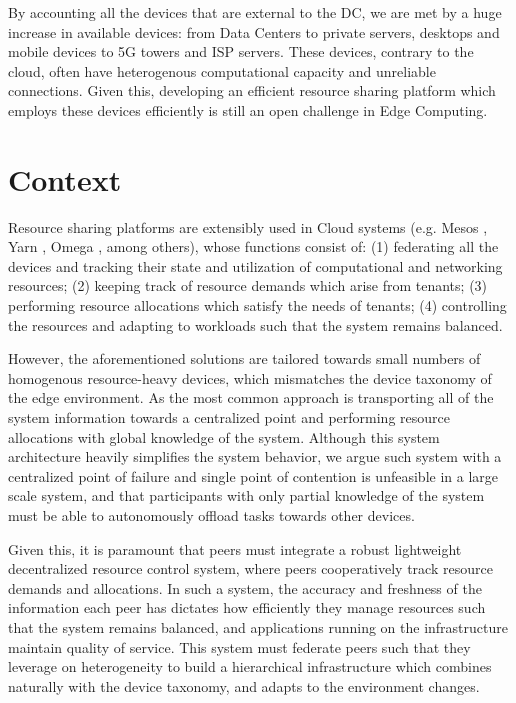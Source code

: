By accounting all the devices that are external to the DC, we are met by a huge increase in available devices: from Data Centers to private servers, desktops and mobile devices to 5G towers and ISP servers. These devices, contrary to the cloud, often have heterogenous computational capacity and unreliable connections. Given this, developing an efficient resource sharing platform which employs these devices efficiently is still an open challenge in Edge Computing. 

\section{Context}

Resource sharing platforms are extensibly used in Cloud systems (e.g. Mesos \cite{hindman2011mesos}, Yarn \cite{Vavilapalli2013ApacheHY}, Omega \cite{41684}, among others), whose functions consist of: (1) federating all the devices and tracking their state and utilization of computational and networking resources; (2) keeping track of resource demands which arise from tenants; (3) performing resource allocations which satisfy the needs of tenants; (4) controlling the resources and adapting to workloads such that the system remains balanced.

However, the aforementioned solutions are tailored towards small numbers of homogenous resource-heavy devices, which mismatches the device taxonomy of the edge environment. As the most common approach is transporting all of the system information towards a centralized point and performing resource allocations with global knowledge of the system. Although this system architecture heavily simplifies the system behavior, we argue such system with a centralized point of failure and single point of contention is unfeasible in a large scale system, and that participants with only partial knowledge of the system must be able to autonomously offload tasks towards other devices.

Given this, it is paramount that peers must integrate a robust lightweight decentralized resource control system, where peers cooperatively track resource demands and allocations. In such a system, the accuracy and freshness of the information each peer has dictates how efficiently they manage resources such that the system remains balanced, and applications running on the infrastructure maintain quality of service. This system must federate peers such that they leverage on heterogeneity to build a hierarchical infrastructure which combines naturally with the device taxonomy, and adapts to the environment changes. 

